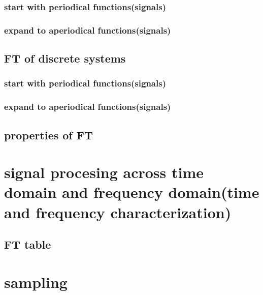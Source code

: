 \documentclass[11pt]{article}
\begin{document}
\subsubsection{start with periodical functions(signals)}
\label{sec:org0f2cd6d}
\subsubsection{expand to aperiodical functions(signals)}
\label{sec:orge1d4d4f}
\subsection{FT of discrete systems}
\label{sec:orgd4f6b92}
\subsubsection{start with periodical functions(signals)}
\label{sec:org0aa3a0e}
\subsubsection{expand to aperiodical functions(signals)}
\label{sec:orgc10d4a5}
\subsection{properties of FT}
\label{sec:orgf2e0c53}
\section{signal procesing across time domain and frequency domain(time and frequency characterization)}
\label{sec:org1a0b010}
\subsection{FT table}
\label{sec:org9c9fa5f}
\section{sampling}
\label{sec:org1ec61d1}
\subsection{}
\label{sec:orgf32b580}
\end{document}
